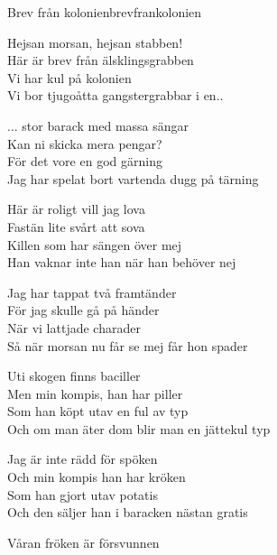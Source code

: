 \begin{song}{Brev från kolonien}{brevfrankolonien}
\begin{vers}
Hejsan morsan, hejsan stabben! \\
Här är brev från älsklingsgrabben\\
Vi har kul på kolonien\\
Vi bor tjugoåtta gangstergrabbar i en..\\
\end{vers}
\begin{vers}
... stor barack med massa sängar\\
Kan ni skicka mera pengar?\\
För det vore en god gärning\\
Jag har spelat bort vartenda dugg på tärning\\
\end{vers}
\begin{vers}
Här är roligt vill jag lova\\
Fastän lite svårt att sova\\
Killen som har sängen över mej\\
Han vaknar inte han när han behöver nej\\
\end{vers}
\begin{vers}
Jag har tappat två framtänder \\
För jag skulle gå på händer\\
När vi lattjade charader\\
Så när morsan nu får se mej får hon spader\\
\end{vers}
\begin{vers}
Uti skogen finns baciller \\
Men min kompis, han har piller\\
Som han köpt utav en ful av typ\\
Och om man äter dom blir man en jättekul typ\\
\end{vers}
\begin{vers}
Jag är inte rädd för spöken\\
Och min kompis han har kröken\\
Som han gjort utav potatis\\
Och den säljer han i baracken nästan gratis\\
\end{vers}
\begin{vers}
Våran fröken är försvunnen \\

\end{vers}
\end{song}
